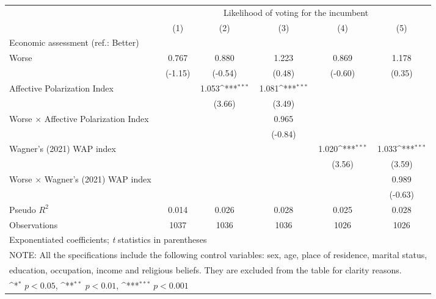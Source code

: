 {
\def\sym#1{\ifmmode^{#1}\else\(^{#1}\)\fi}
\begin{tabular}{l*{5}{c}}
\toprule
                &\multicolumn{5}{c}{Likelihood of voting for the incumbent}                                    \\\cmidrule(lr){2-6}
                &\multicolumn{1}{c}{(1)}         &\multicolumn{1}{c}{(2)}         &\multicolumn{1}{c}{(3)}         &\multicolumn{1}{c}{(4)}         &\multicolumn{1}{c}{(5)}         \\
\midrule
Economic assessment (ref.: Better)&                  &                  &                  &                  &                  \\
Worse           &    0.767         &    0.880         &    1.223         &    0.869         &    1.178         \\
                &  (-1.15)         &  (-0.54)         &   (0.48)         &  (-0.60)         &   (0.35)         \\
Affective Polarization Index&                  &    1.053\sym{***}&    1.081\sym{***}&                  &                  \\
                &                  &   (3.66)         &   (3.49)         &                  &                  \\
Worse $\times$ Affective Polarization Index&                  &                  &    0.965         &                  &                  \\
                &                  &                  &  (-0.84)         &                  &                  \\
Wagner's (2021) WAP index&                  &                  &                  &    1.020\sym{***}&    1.033\sym{***}\\
                &                  &                  &                  &   (3.56)         &   (3.59)         \\
Worse $\times$ Wagner's (2021) WAP index&                  &                  &                  &                  &    0.989         \\
                &                  &                  &                  &                  &  (-0.63)         \\
\midrule
Pseudo \(R^{2}\)&    0.014         &    0.026         &    0.028         &    0.025         &    0.028         \\
Observations    &     1037         &     1036         &     1036         &     1026         &     1026         \\
\bottomrule
\multicolumn{6}{l}{\footnotesize Exponentiated coefficients; \textit{t} statistics in parentheses}\\
\multicolumn{6}{l}{\footnotesize NOTE: All the specifications include the following control variables: sex, age, place of residence, marital status,}\\
\multicolumn{6}{l}{\footnotesize education, occupation, income and religious beliefs. They are excluded from the table for clarity reasons.}\\
\multicolumn{6}{l}{\footnotesize \sym{*} \(p<0.05\), \sym{**} \(p<0.01\), \sym{***} \(p<0.001\)}\\
\end{tabular}
}
